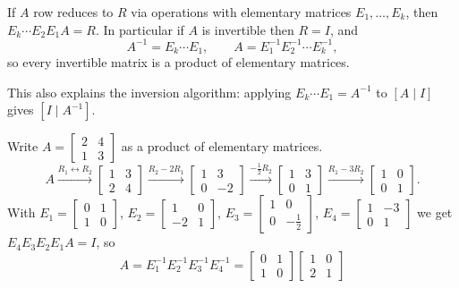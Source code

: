 \begin{theorem}
If $A$ row reduces to $R$ via operations with elementary matrices $E_1,\dots,E_k$, then
$E_k\cdots E_2E_1A=R$. In particular if $A$ is invertible then $R=I$, and
\[
  A^{-1}=E_k\cdots E_1, \qquad A = E_1^{-1}E_2^{-1}\cdots E_k^{-1},
\]
so every invertible matrix is a product of elementary matrices.
\end{theorem}

This also explains the inversion algorithm: applying $E_k\cdots E_1=A^{-1}$ to $[A\mid I]$ gives
$[I\mid A^{-1}]$.

\begin{example}
Write $A=\begin{bmatrix}2&4\\1&3\end{bmatrix}$ as a product of elementary matrices.
\[
A\xrightarrow{R_1\leftrightarrow R_2}\begin{bmatrix}1&3\\2&4\end{bmatrix}
\xrightarrow{R_2-2R_1}\begin{bmatrix}1&3\\0&-2\end{bmatrix}
\xrightarrow{-\frac12R_2}\begin{bmatrix}1&3\\0&1\end{bmatrix}
\xrightarrow{R_1-3R_2}\begin{bmatrix}1&0\\0&1\end{bmatrix}.
\]
With $E_1=\begin{bmatrix}0&1\\1&0\end{bmatrix}$, $E_2=\begin{bmatrix}1&0\\-2&1\end{bmatrix}$,
$E_3=\begin{bmatrix}1&0\\0&-\frac12\end{bmatrix}$, $E_4=\begin{bmatrix}1&-3\\0&1\end{bmatrix}$ we get
$E_4E_3E_2E_1A=I$, so
\[
  A=E_1^{-1}E_2^{-1}E_3^{-1}E_4^{-1}
   =\begin{bmatrix}0&1\\1&0\end{bmatrix}\begin{bmatrix}1&0\\2&1\end{bmatrix}
\]
\end{example}
